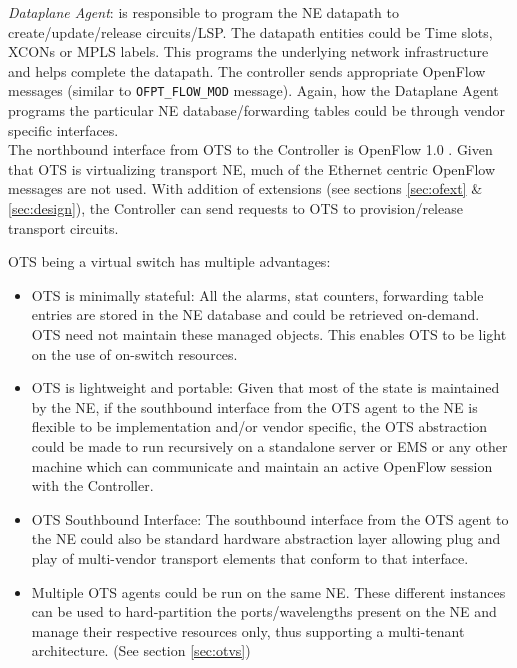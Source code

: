 \documentclass{sig-alternate-2013}
\begin{document}
	\textit{Dataplane Agent}: is responsible to program the NE datapath to create/update/release
		circuits/LSP. The datapath entities could be Time slots, XCONs or MPLS labels. This
		programs the underlying network infrastructure and helps complete the datapath. The controller sends
		appropriate OpenFlow messages (similar to \texttt{OFPT\_FLOW\_MOD} message). Again, how the Dataplane
		Agent programs the particular NE database/forwarding tables could be through vendor specific interfaces. \\
	
	The northbound interface from OTS to the Controller is OpenFlow 1.0 \cite{OF1.0}. Given that OTS is
	virtualizing transport NE, much of the Ethernet centric OpenFlow messages are not used. With addition of
	extensions (see sections \ref{sec:ofext} \& \ref{sec:design}), the Controller can send requests to OTS
	to provision/release transport circuits.
	
	OTS being a virtual switch has multiple advantages:

	\begin{itemize} 
	   \item OTS is minimally stateful: All the alarms, stat counters, forwarding table entries are 
		stored in the NE database and could be retrieved on-demand. OTS need not maintain these managed objects. 
		This enables OTS to be light on the use of on-switch resources.
	   \item OTS is lightweight and portable: Given that most of the state is maintained by the NE, if the southbound 
		interface from the OTS agent to the NE is flexible to be implementation and/or vendor specific, the OTS 
		abstraction could be made to run recursively on a standalone server or EMS or any other machine which can communicate 
		and maintain an active OpenFlow session with the Controller.
	   \item OTS Southbound Interface: The southbound interface from the OTS agent to the NE could also be 
		standard hardware abstraction layer allowing plug and play of multi-vendor transport elements that conform to that interface. 
  	   \item Multiple OTS agents could be run on the same NE. These different instances can be used to hard-partition the ports/wavelengths 
	   present on the NE and manage their respective resources only, thus supporting a multi-tenant architecture. 
		(See section \ref{sec:otvs})
	\end{itemize}
\end{document}
